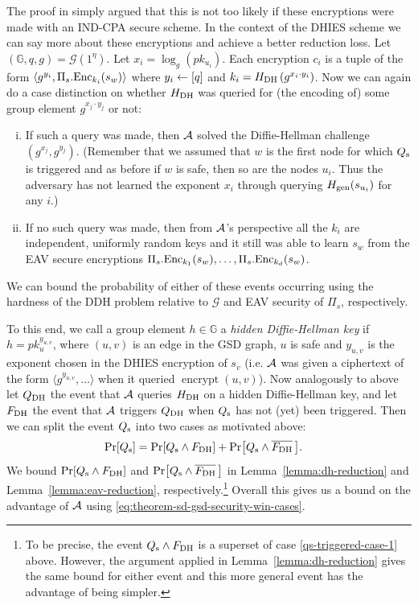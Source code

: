 The proof in \cite{ttkem} simply argued that this is not too likely if these encryptions were made with an IND-CPA secure scheme. In the context of the DHIES scheme we can say more about these encryptions and achieve a better reduction loss.
Let $(\mathbb{G}, q, g) = \mathcal{G}(1^\eta)$.
Let $x_i = \log_g(pk_{u_i})$. Each encryption $c_i$ is a tuple of the form $\langle g^{y_i}, \Pi_s.\mathrm{Enc}_{k_i}(s_w) \rangle$ where $y_i \leftarrow [q]$ and $k_i = H_\mathrm{DH}\left(g^{x_i \cdot y_i}\right)$. Now we can again do a case distinction on whether $H_\mathrm{DH}$ was queried for (the encoding of) some group element $g^{x_j \cdot y_j}$ or not:
\begin{enumerate}[(i)]
	\item \label{qs-triggered-case-1} If such a query was made, then $\mathcal{A}$ solved the Diffie-Hellman challenge $(g^{x_j}, g^{y_j})$. (Remember that we assumed that $w$ is the first node for which $Q_\mathrm{s}$ is triggered and as before if $w$ is safe, then so are the nodes $u_i$. Thus the adversary has not learned the exponent $x_i$ through querying $H_\mathrm{gen}(s_{u_i})$ for any $i$.)
	\item \label{qs-triggered-case-2} If no such query was made, then from $\mathcal{A}$'s perspective all the $k_i$ are independent, uniformly random keys and it still was able to learn $s_w$ from the EAV secure encryptions $\Pi_s.\mathrm{Enc}_{k_1}(s_w), \ldots, \Pi_s.\mathrm{Enc}_{k_d}(s_w)$.
\end{enumerate}
We can bound the probability of either of these events occurring using the hardness of the DDH problem relative to $\mathcal{G}$ and EAV security of $\Pi_s$, respectively.

To this end, we call a group element $h \in \mathbb{G}$ a \emph{hidden Diffie-Hellman key} if $h = pk_u^{y_{u, v}}$, where $(u, v)$ is an edge in the GSD graph, $u$ is safe and $y_{u, v}$ is the exponent chosen in the DHIES encryption of $s_v$ (i.e. $\mathcal{A}$ was given a ciphertext of the form $\langle g^{y_{u, v}}, \ldots\rangle$ when it queried $\operatorname{encrypt}(u, v)$). Now analogously to above let $Q_\mathrm{DH}$ the event that $\mathcal{A}$ queries $H_\mathrm{DH}$ on a hidden Diffie-Hellman key, and let $F_\mathrm{DH}$ the event that $\mathcal{A}$ triggers $Q_\mathrm{DH}$ when $Q_\mathrm{s}$ has not (yet) been triggered.
Then we can split the event $Q_\mathrm{s}$ into two cases as motivated above:
\begin{align*}
	\pr{\qs} & = \pr{\qs \land \fdh} + \pr{\qs \land \overline{\fdh}\,}.
\end{align*}
We bound $\pr{\qs \land \fdh}$ and $\pr{\qs \land \overline{\fdh} \,}$ in Lemma~\ref{lemma:dh-reduction} and Lemma~\ref{lemma:eav-reduction}, respectively.\footnote{To be precise, the event $Q_\mathrm{s} \land F_\mathrm{DH}$ is a superset of case \ref{qs-triggered-case-1} above. However, the argument applied in Lemma~\ref{lemma:dh-reduction} gives the same bound for either event and this more general event has the advantage of being simpler.}
Overall this gives us a bound on the advantage of $\mathcal{A}$ using \eqref{eq:theorem-sd-gsd-security-win-cases}.

